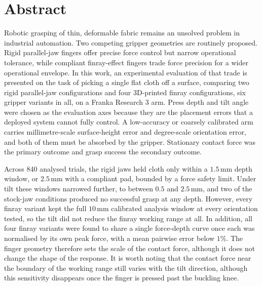 \chapter*{\rm\bfseries Abstract}

Robotic grasping of thin, deformable fabric remains an unsolved problem
in industrial automation. Two competing gripper geometries are routinely
proposed. Rigid parallel-jaw fingers offer precise force control but
narrow operational tolerance, while compliant finray-effect fingers
trade force precision for a wider operational envelope. In this work,
an experimental evaluation of that trade is presented on the task of
picking a single flat cloth off a surface, comparing two rigid
parallel-jaw configurations and four 3D-printed finray configurations,
six gripper variants in all, on a Franka Research 3 arm. Press depth and tilt
angle were chosen as the evaluation axes because they are the placement
errors that a deployed system cannot fully control. A low-accuracy or
coarsely calibrated arm carries millimetre-scale surface-height error
and degree-scale orientation error, and both of them must be absorbed
by the gripper. Stationary contact force was the primary outcome and
grasp success the secondary outcome.

Across 840 analysed trials, the rigid jaws held cloth only within a
$1.5$\,mm depth window, or $2.5$\,mm with a compliant pad, bounded by a
force safety limit. Under tilt these windows narrowed further, to
between $0.5$ and $2.5$\,mm, and two of the stock-jaw conditions
produced no successful grasp at any depth. However, every finray
variant kept the full $10$\,mm calibrated analysis window at every
orientation tested, so the tilt did not reduce the finray working range
at all. In addition, all four finray variants were found to share a
single force-depth curve once each was normalised by its own peak
force, with a mean pairwise error below $1\%$. The finger geometry
therefore sets the scale of the contact force, although it does not
change the shape of the response. It is worth noting that the contact
force near the boundary of the working range still varies with the tilt
direction, although this sensitivity disappears once the finger is
pressed past the buckling knee.
